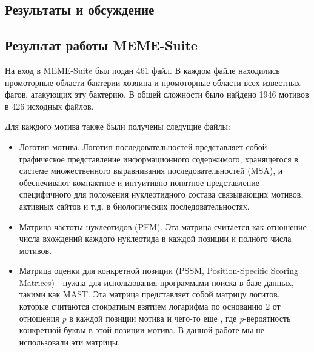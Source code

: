 \documentclass[14pt]{extarticle}
\begin{document}
\newpage
\begin{center}
    \item \section{Результаты и обсуждение}
    \item \subsection{Результат работы MEME-Suite}
\end{center}

    
    \par{На вход в MEME-Suite был подан 461 файл. В каждом файле находились промоторные области бактерии-хозяина и 
    промоторные области всех известных \cite{virus-host} фагов, атакующих эту бактерию. В общей сложности было найдено 
    1946 мотивов в 426 исходных файлов.}
    
    \par{Для каждого мотива также были получены следущие файлы: }
    
    \begin{itemize}
    \item Логотип мотива. Логотип последовательностей представляет собой графическое представление информационного
    содержимого, хранящегося в системе множественного выравнивания последовательностей (MSA), и обеспечивают
    компактное и интуитивно понятное представление специфичного для положения нуклеотидного состава связывающих
    мотивов, активных сайтов и т.д. в биологических последовательностях.
   
    \item Матрица частоты нуклеотидов (PFM). Эта матрица считается как отношение числа вхождений каждого нуклеотида в 
    каждой позиции и полного числа мотивов. 
    
    \item Матрица оценки для конкретной позиции (PSSM, Position-Specific Scoring Matrices) - нужна для использования 
    программами поиска в базе данных, такими как MAST. Эта матрица представляет собой матрицу логитов, которые считаются
    стократным взятием логарифма по основанию 2 от отношения \textit{p} в каждой позиции мотива и чего-то еще 
    \cite{memeres}, где \textit{p}-вероятность конкретной буквы в этой позиции мотива. В данной работе мы не 
    использовали эти матрицы.  
    \end{itemize}
    
\end{document}
